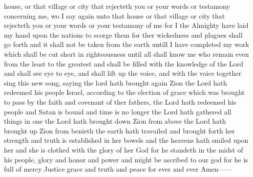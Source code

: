 house, or that village or city that rejecteth you or your words or testamony concerning me, wo I say again unto that house or that village or city that rejecteth you or your words or your testamony of me for I the Almighty have laid my hand upon the nations to scorge them for ther wickedness and plagues shall go forth and it shall not be taken from the earth untill I have completed my work which shall be cut short in righteousness until all shall know me who remain even from the least to the greatest and shall be filled with the knowledge of the Lord and shall see eye to eye, and shall lift up the voice, and with the voice together sing this new song, saying the lord hath brought again Zion the Lord hath redeemed his people Israel, according to the election of grace which was brought to pass by the faith and covenant of ther fathers, the Lord hath redeemed his people and Satan is bound and time is no longer the Lord hath gathered all things in one the Lord hath brought down Zion from above the Lord hath brought up Zion from benieth the earth hath travailed and brought forth her strength and truth is established in her bowels and the heavens hath smiled upon her and she is clothed with the glory of her God for he standeth in the midst of his people, glory and honor and power and might be ascribed to our god for he is full of mercy Justice grace and truth and peace for ever and ever Amen------
				
